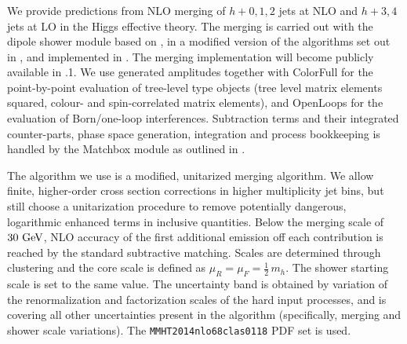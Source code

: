 \subsubsection{\Herwig}
\label{sec:hjetscomp:tools:mc:herwig}

We provide predictions from NLO merging of $h+0,1,2$ jets at NLO and $h+3,4$
jets at LO in the Higgs effective theory. The merging is carried out with the
\Herwig \ \cite{Bellm:2015jjp} dipole shower module based on
\cite{Platzer:2009jq,Platzer:2011bc}, in a modified version of the algorithms
set out in \cite{Platzer:2012bs,Lonnblad:2012ix}, and implemented in
\cite{Bellm:thesis,Bellm:2016xxx}. The merging implementation will become
publicly available in \Herwig{}.1. We use \MGaMC
\cite{Alwall:2014hca} generated amplitudes together with \textsf{ColorFull}
\cite{Sjodahl:2014opa} for the point-by-point evaluation of tree-level type
objects (tree level matrix elements squared, colour- and spin-correlated
matrix elements), and \textsf{OpenLoops} \cite{Cascioli:2011va} for the
evaluation of Born/one-loop interferences.  Subtraction terms and their
integrated counter-parts, phase space generation, integration and process
bookkeeping is handled by the \textsf{Matchbox} module as outlined in
\cite{Bellm:2015jjp}.

The algorithm we use is a modified, unitarized merging algorithm. We allow
finite, higher-order cross section corrections in higher multiplicity jet
bins, but still choose a unitarization procedure to remove potentially
dangerous, logarithmic enhanced terms in inclusive quantities. Below the
merging scale of $30\ {\rm GeV}$, NLO accuracy of the first additional
emission off each contribution is reached by the standard subtractive
matching. Scales are determined through clustering and the core scale 
is defined as $\mu_R=\mu_F=\tfrac{1}{2}\,m_h$. The shower starting scale 
is set to the same value. The uncertainty band is obtained by variation of 
the renormalization and factorization scales of the hard input processes, 
and is covering all other uncertainties present in the algorithm 
(specifically, merging and shower scale variations).
The \texttt{MMHT2014nlo68clas0118} PDF set \cite{Harland-Lang:2014zoa} 
is used.
